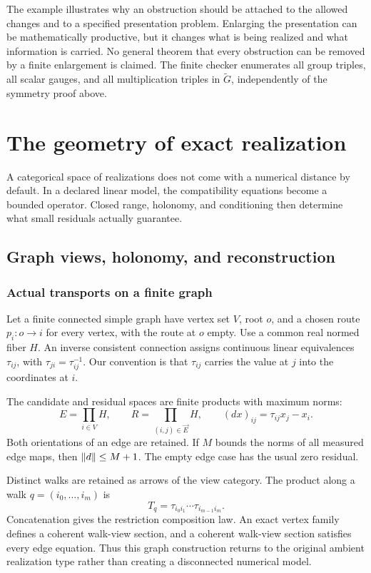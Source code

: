 The example illustrates why an obstruction should be attached to the allowed changes and to a specified presentation problem. Enlarging the presentation can be mathematically productive, but it changes what is being realized and what information is carried. No general theorem that every obstruction can be removed by a finite enlargement is claimed. The finite checker enumerates all group triples, all scalar gauges, and all multiplication triples in \(\widetilde G\), independently of the symmetry proof above.





\chapter{The geometry of exact realization}\label{KS:book:chapter-22}
A categorical space of realizations does not come with a numerical distance by default. In a declared linear model, the compatibility equations become a bounded operator. Closed range, holonomy, and conditioning then determine what small residuals actually guarantee.

\section{Graph views, holonomy, and reconstruction}\label{KS:sec:graph}
\subsection{Actual transports on a finite graph}
Let a finite connected simple graph have vertex set \(V\), root \(o\), and a chosen route \(p_i:o\to i\) for every vertex, with the route at \(o\) empty. Use a common real normed fiber \(H\). An inverse consistent connection assigns continuous linear equivalences \(\tau_{ij}\), with \(\tau_{ji}=\tau_{ij}^{-1}\). Our convention is that \(\tau_{ij}\) carries the value at \(j\) into the coordinates at \(i\).

The candidate and residual spaces are finite products with maximum norms:
\[
 E=\prod_{i\in V}H,\qquad
 R=\prod_{(i,j)\in\vec E}H,\qquad
 (dx)_{ij}=\tau_{ij}x_j-x_i.
\]
Both orientations of an edge are retained. If \(M\) bounds the norms of all measured edge maps, then \(\left\lVert d\right\rVert\le M+1\). The empty edge case has the usual zero residual.

Distinct walks are retained as arrows of the view category. The product along a walk \(q=(i_0,\ldots,i_m)\) is
\[
 T_q=\tau_{i_0i_1}\cdots\tau_{i_{m-1}i_m}.
\]
Concatenation gives the restriction composition law. An exact vertex family defines a coherent walk-view section, and a coherent walk-view section satisfies every edge equation. Thus this graph construction returns to the original ambient realization type rather than creating a disconnected numerical model.


